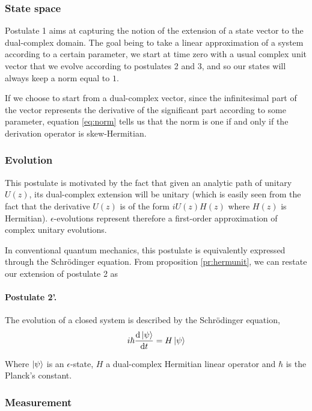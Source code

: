\documentclass{article}
\newcommand{\e}{\epsilon}
\newcommand\dstate[2]{\frac{\mathrm{d}\ket{#1}}{\mathrm{d}#2}}
\begin{document}
\subsubsection*{State space}

Postulate 1 aims at capturing the notion of the extension of a state vector to the dual-complex domain. The goal being to take a linear approximation of a system according to a certain parameter, we start at time zero with a usual complex unit vector that we evolve according to postulates 2 and 3, and so our states will always keep a norm equal to $1$.

If we choose to start from a dual-complex vector, since the infinitesimal part of the vector represents the derivative of the significant part according to some parameter, equation \ref{eq:norm} tells us that the norm is one if and only if the derivation operator is skew-Hermitian.

\subsubsection*{Evolution}

This postulate is motivated by the fact that given an analytic path of unitary $U(z)$, its dual-complex extension will be unitary (which is easily seen from the fact that the derivative $U(z)$ is of the form $iU(z)H(z)$ where $H(z)$ is Hermitian). $\e$-evolutions represent therefore a first-order approximation of complex unitary evolutions.

In conventional quantum mechanics, this postulate is equivalently expressed through the Schrödinger equation. From proposition \ref{pr:hermunit}, we can restate our extension of postulate 2 as

\paragraph{Postulate 2'.} The evolution of a closed system is described by the Schrödinger equation,
\begin{equation}
 i\hbar \dstate \psi t = H\ket\psi
\end{equation}

Where $\ket\psi$ is an $\e$-state, $H$ a dual-complex Hermitian linear operator and $\hbar$ is the Planck's constant.

\subsubsection*{Measurement}
\end{document}
